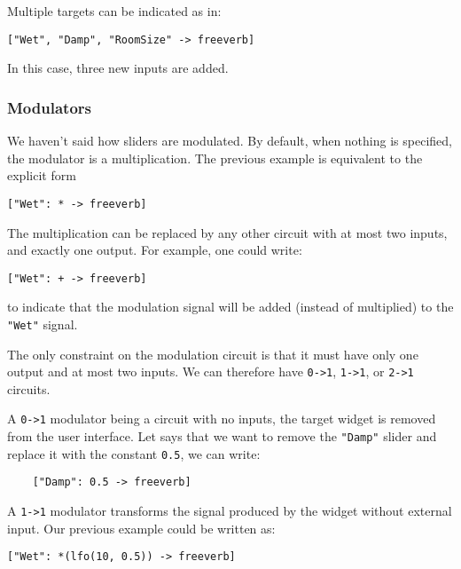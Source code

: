 Multiple targets can be indicated as in: 

\begin{lstlisting}
["Wet", "Damp", "RoomSize" -> freeverb]
\end{lstlisting}

In this case, three new inputs are added. 

\subsubsection{Modulators}

We haven't said how sliders are modulated. By default, when nothing is specified, the modulator is a multiplication. The previous example is equivalent to the explicit form 

\begin{lstlisting}
["Wet": * -> freeverb]
\end{lstlisting}

The multiplication can be replaced by any other circuit with at most two inputs, and exactly one output. For example, one could write:

\begin{lstlisting}
["Wet": + -> freeverb]
\end{lstlisting}

to indicate that the modulation signal will be added (instead of multiplied) to the \lstinline`"Wet"` signal.

The only constraint on the modulation circuit is that it must have only one output and at most two inputs. We can therefore have \lstinline`0->1`, \lstinline`1->1`, or \lstinline`2->1` circuits. 

A \lstinline`0->1` modulator being a circuit with no inputs, the target widget is removed from the user interface. Let says that we want to remove the \lstinline`"Damp"` slider and replace it with the constant \lstinline`0.5`, we can write:

\begin{lstlisting}
	["Damp": 0.5 -> freeverb]
\end{lstlisting}
	
A \lstinline`1->1` modulator transforms the signal produced by the widget without external input. Our previous example could be written as:

\begin{lstlisting}
["Wet": *(lfo(10, 0.5)) -> freeverb]
\end{lstlisting}

